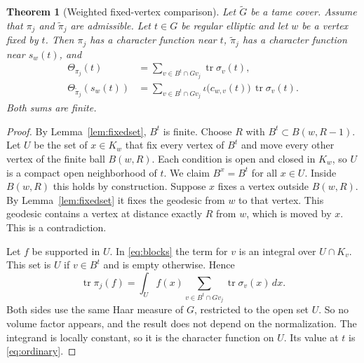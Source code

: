 \documentclass[12pt,letterpaper]{article}
\numberwithin{equation}{section}
\newtheorem{theorem}{Theorem}[section]
\theoremstyle{definition}
\theoremstyle{remark}
\newcommand{\Gt}{\widetilde G}
\newcommand{\tr}{\operatorname{tr}}
\begin{document}
\begin{theorem}[Weighted fixed-vertex comparison]\label{thm:weighted}
Let $\Gt$ be a tame cover. Assume that $\pi_j$ and $\widetilde\pi_j$ are admissible. Let $t\in G$ be regular elliptic and let $w$ be a vertex fixed by $t$. Then $\pi_j$ has a character function near $t$, $\widetilde\pi_j$ has a character function near $s_w(t)$, and
\begin{align}
 \Theta_{\pi_j}(t)&=\sum_{v\in B^t\cap Gv_j}\tr\sigma_v(t),\label{eq:ordinary}\\
 \Theta_{\widetilde\pi_j}(s_w(t))
 &=\sum_{v\in B^t\cap Gv_j}
 \iota\bigl(c_{w,v}(t)\bigr)\,\tr\sigma_v(t).\label{eq:weighted}
\end{align}
Both sums are finite.
\end{theorem}
\begin{proof}
By Lemma~\ref{lem:fixedset}, $B^t$ is finite. Choose $R$ with $B^t\subset B(w,R-1)$. Let $U$ be the set of $x\in K_w$ that fix every vertex of $B^t$ and move every other vertex of the finite ball $B(w,R)$. Each condition is open and closed in $K_w$, so $U$ is a compact open neighborhood of $t$. We claim $B^x=B^t$ for all $x\in U$. Inside $B(w,R)$ this holds by construction. Suppose $x$ fixes a vertex outside $B(w,R)$. By Lemma~\ref{lem:fixedset} it fixes the geodesic from $w$ to that vertex. This geodesic contains a vertex at distance exactly $R$ from $w$, which is moved by $x$. This is a contradiction.

Let $f$ be supported in $U$. In \eqref{eq:blocks} the term for $v$ is an integral over $U\cap K_v$. This set is $U$ if $v\in B^t$ and is empty otherwise. Hence
\[
 \tr\pi_j(f)=\int_Uf(x)\sum_{v\in B^t\cap Gv_j}\tr\sigma_v(x)\,dx .
\]
Both sides use the same Haar measure of $G$, restricted to the open set $U$. So no volume factor appears, and the result does not depend on the normalization. The integrand is locally constant, so it is the character function on $U$. Its value at $t$ is \eqref{eq:ordinary}.


\end{proof}
\end{document}
